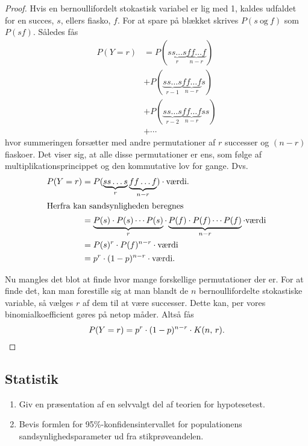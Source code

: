 \documentclass{article}
\begin{document}
\begin{proof}
Hvis en bernoullifordelt stokastisk variabel er lig med 1, kaldes udfaldet for
en succes, $s$, ellers fiasko, $f$. For at spare på blækket skrives
$P(s\:\text{og}\:f)$ som $P(sf)$. Således fås
\begin{align*}
	P(Y = r) &= P(\underbrace{ss \dotso s}_r \underbrace{ff \dotso f}_{n-r})\\ 
			 &+ P(\underbrace{ss \dotso s}_{r-1} \underbrace{ff \dotso f}_{n-r}s)\\
			 &+ P(\underbrace{ss \dotso s}_{r-2} \underbrace{ff \dotso f}_{n-r}ss)\\
			 &+ \dotsb
\end{align*}
hvor summeringen forsætter med andre permutationer af $r$ successer og $(n-r)$
fiaskoer. Det viser sig, at alle disse permutationer er ens, som følge af
multiplikationsprincippet og den kommutative lov for gange. Dvs.
\begin{align*}
	P(Y = r) &= P(\underbrace{ss \dotso s}_r \underbrace{ff \dotso f}_{n-r}) \cdot \text{værdi}.\\
	\intertext{Herfra kan sandsynligheden beregnes}
			 &= \underbrace{P(s) \cdot P(s) \dotsm P(s)}_r \cdot 
			 \underbrace{P(f) \cdot P(f) \dotsm P(f)}_{n-r} \cdot \text{værdi}\\
			 &= P(s)^r \cdot P(f)^{n-r} \cdot \text{værdi}\\
			 &= p^r \cdot (1-p)^{n-r} \cdot \text{værdi}.
\end{align*}


Nu mangles det blot at finde hvor mange forskellige permutationer der er. For at
finde det, kan man forestille sig at man blandt de $n$ bernoullifordelte
stokastiske variable, så vælges $r$ af dem til at være successer. Dette kan, per
vores binomialkoefficient gøres på netop  måder. Altså fås
\[
	P(Y = r) = p^r \cdot (1-p)^{n-r} \cdot \nobreak{K(n,\,r)}.\qedhere
\] 
\end{proof}

\begin{tcolorbox}
	\section{Statistik}
	\tcblower
	\begin{enumerate}
		\item Giv en præsentation af en selvvalgt del af teorien for
			hypotesetest.
		\item Bevis formlen for 95\%-konfidensintervallet for populationens
			sandsynlighedsparameter ud fra stikprøveandelen. 	
	\end{enumerate}
\end{tcolorbox}
\end{document}
